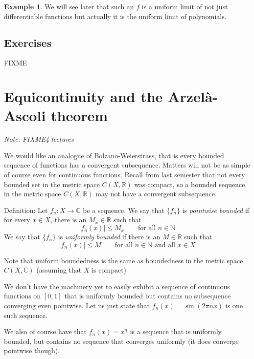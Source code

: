 \documentclass[12pt]{book}
\newcommand{\abs}[1]{\left\lvert {#1} \right\rvert}
\newcommand{\C}{{\mathbb{C}}}
\newcommand{\R}{{\mathbb{R}}}
\newcommand{\N}{{\mathbb{N}}}
\newcommand{\sectionnotes}[1]{\noindent \emph{Note: #1} \medskip \par}
\newcommand{\sectionnewpage}{\clearpage}
\theoremstyle{plain}
\theoremstyle{remark}
\theoremstyle{definition}
\theoremstyle{exercise}
\theoremstyle{example}
\newtheorem{example}[thm]{Example}
\begin{document}
\begin{example}
We will see later that such an $f$ is a uniform limit of not just
differentiable functions but actually it is the uniform limit of
polynomials.
\end{example}

\subsection{Exercises}

FIXME


\sectionnewpage
\section{Equicontinuity and the Arzel{\` a}-Ascoli theorem}
\label{sec:FIXME}

\sectionnotes{FIXME4 lectures}

\medskip

We would like an analogue of Bolzano-Weierstrass, that is every bounded
sequence of functions has a convergent subsequence.  Matters will not
be as simple of course even for continuous functions.  Recall from last
semester that not every bounded set in the metric space $C(X,\R)$ was compact,
so a bounded sequence in the metric space $C(X,\R)$ may not have a
convergent subsequence.

\medskip

Definition:
Let $f_n \colon X \to \C$ be a sequence.  We say that
$\{ f_n \}$
is \emph{pointwise bounded} if for every $x \in X$, there is an $M_x \in \R$
such that
$$
\abs{f_n(x)} \leq M_x \qquad \text{for all $n \in \N$}
$$
We say that
$\{ f_n \}$
is \emph{uniformly bounded} if there is an $M \in \R$
such that
$$
\abs{f_n(x)} \leq M \qquad \text{for all $n \in \N$ and all $x \in X$}
$$


Note that uniform boundedness is the same as boundedness in the metric space
$C(X,\C)$ (assuming that $X$ is compact)


We don't have the machinery yet to easily exhibit
a sequence of continuous functions
on $[0,1]$ that is uniformly bounded but contains no subsequence converging
even pointwise.  Let us just state that $f_n(x) = \sin (2\pi n x)$ is one
such sequence.


We also of course have that $f_n(x)=x^n$ is a sequence that is uniformly
bounded, but contains no sequence that converges uniformly (it does converge
pointwise though).
\end{document}
